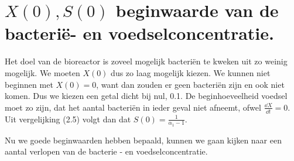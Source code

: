 \section{$X(0), S(0)$ beginwaarde van de bacteri\"e- en voedselconcentratie.}
Het doel van de bioreactor is zoveel mogelijk bacteri\"en te kweken uit zo weinig mogelijk. We moeten $X(0)$ dus zo laag mogelijk kiezen. We kunnen niet beginnen met $X(0) = 0$, want dan zouden er geen bacteri\"en zijn en ook niet komen. Dus we kiezen een getal dicht bij nul, 0.1.
De beginhoeveelheid voedsel moet zo zijn, dat het aantal bacteri\"en in ieder geval niet afneemt, ofwel $\frac{\dd X}{\dd t} = 0$. Uit vergelijking (2.5) volgt dan dat $S(0) = \frac{1}{\alpha_1 - 1}$.

Nu we goede beginwaarden hebben bepaald, kunnen we gaan kijken naar een aantal verlopen van de bacterie - en voedselconcentratie.
